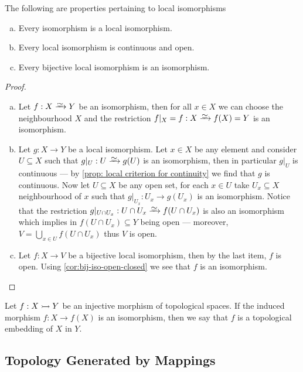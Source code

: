 \begin{proposition}\label{prop:properties-local-homeomorphism}
The following are properties pertaining to local isomorphisms
\begin{enumerate}[(a)]\setlength\itemsep{0em}
\item Every isomorphism is a local isomorphism.
\item Every local isomorphism is continuous and open.
\item Every bijective local isomorphism is an isomorphism.
\end{enumerate}
\end{proposition}

\begin{proof}
\begin{enumerate}[(a)]\setlength\itemsep{0em}
\item Let \(f: X \isoto Y\) be an isomorphism, then for all \(x \in X\) we can
  choose the neighbourhood \(X\) and the restriction \(f|_X = f: X \isoto f(X) =
  Y\) is an isomorphism.
\item Let \(g: X \to Y\) be a local isomorphism. Let \(x \in X\) be any element
  and consider \(U \subseteq X\) such that \(g|_U: U \isoto g(U)\) is an
  isomorphism, then in particular \(g|_U\) is continuous --- by \cref{prop:
  local criterion for continuity} we find that \(g\) is continuous. Now let \(U
  \subseteq X\) be any open set, for each \(x \in U\) take \(U_x \subseteq X\)
  neighbourhood of \(x\) such that \(g|_{U_x}: U_x \to g(U_x)\) is an
  isomorphism. Notice that the restriction \(g|_{U \cap U_x}: U \cap U_x \isoto
  f(U \cap U_x)\) is also an isomorphism which implies in \(f(U \cap U_x)
  \subseteq Y\) being open --- moreover, \(V = \bigcup_{x \in U} f(U \cap
  U_{x})\) thus \(V\) is open.
\item Let \(f: X \to V\) be a bijective local isomorphism, then by the last item,
  \(f\) is open. Using \cref{cor:bij-iso-open-closed} we see that \(f\) is an
  isomorphism.
\end{enumerate}
\end{proof}

\begin{definition}[Embedding]\label{def:top-embedding}
Let \(f: X \rightarrowtail Y\) be an injective morphism of topological spaces. If the
induced morphism \(f: X \to f(X)\) is an isomorphism, then we say that \(f\) is a
topological embedding of \(X\) in \(Y\).
\end{definition}

\subsection{Topology Generated by Mappings}

